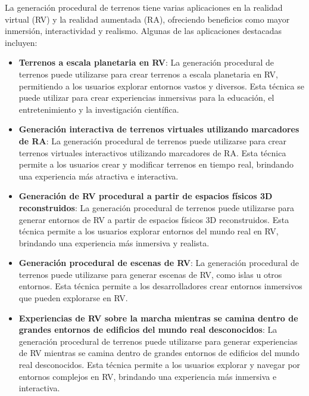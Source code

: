 La generación procedural de terrenos tiene varias aplicaciones en la realidad virtual (RV) y la realidad aumentada (RA), ofreciendo beneficios como mayor inmersión, interactividad y realismo. Algunas de las aplicaciones destacadas incluyen:

\begin{itemize}
    \item \textbf{Terrenos a escala planetaria en RV}: La generación procedural de terrenos puede utilizarse para crear terrenos a escala planetaria en RV, permitiendo a los usuarios explorar entornos vastos y diversos. Esta técnica se puede utilizar para crear experiencias inmersivas para la educación, el entretenimiento y la investigación científica\cite{VRPlanetaryTerrains}.
    
    \item \textbf{Generación interactiva de terrenos virtuales utilizando marcadores de RA}: La generación procedural de terrenos puede utilizarse para crear terrenos virtuales interactivos utilizando marcadores de RA. Esta técnica permite a los usuarios crear y modificar terrenos en tiempo real, brindando una experiencia más atractiva e interactiva\cite{ARInteractiveTerrain}.
    
    \item \textbf{Generación de RV procedural a partir de espacios físicos 3D reconstruidos}: La generación procedural de terrenos puede utilizarse para generar entornos de RV a partir de espacios físicos 3D reconstruidos. Esta técnica permite a los usuarios explorar entornos del mundo real en RV, brindando una experiencia más inmersiva y realista\cite{VR3DReconstructedSpace}.
    
    \item \textbf{Generación procedural de escenas de RV}: La generación procedural de terrenos puede utilizarse para generar escenas de RV, como islas u otros entornos. Esta técnica permite a los desarrolladores crear entornos inmersivos que pueden explorarse en RV\cite{VRSceneGeneration}.
    
    \item \textbf{Experiencias de RV sobre la marcha mientras se camina dentro de grandes entornos de edificios del mundo real desconocidos}: La generación procedural de terrenos puede utilizarse para generar experiencias de RV mientras se camina dentro de grandes entornos de edificios del mundo real desconocidos. Esta técnica permite a los usuarios explorar y navegar por entornos complejos en RV, brindando una experiencia más inmersiva e interactiva\cite{VRWalkingEnvironments}.
\end{itemize}

